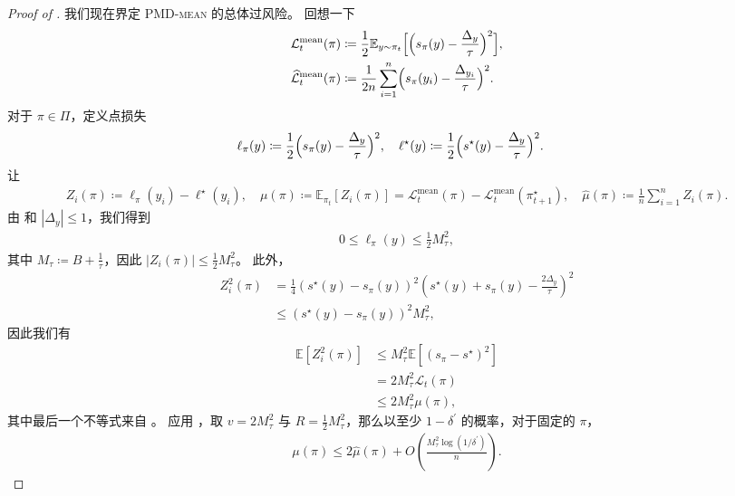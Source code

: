 \documentclass{article}
\theoremstyle{plain}
\theoremstyle{definition}
\theoremstyle{remark}
\newcommand{\E}{\mathbb{E}}
\newcommand{\abs}[1]{\left|#1\right|}
\begin{document}
\begin{proof}[Proof of ]
    我们现在界定 \textsc{PMD-mean} 的总体过风险。  
回想一下 
    \begin{align*}
        &\mathcal{L}^{\mathrm{mean}}_t(\pi)
        \coloneqq\frac{1}{2}\E_{y\sim\pi_t}\Bigl[\Bigl(s_\pi(y)-\frac{\Delta_y}{\tau}\Bigr)^2\Bigr],\\
        &\widehat{\mathcal{L}}^{\mathrm{mean}}_t(\pi) \coloneqq\frac{1}{2n}\sum_{i=1}^n\Bigl(s_\pi(y_i)-\frac{\Delta_{y_i}}{\tau}\Bigr)^2.
    \end{align*}
    对于 $\pi\in\Pi$，定义点损失
    \begin{align*}
        &\ell_\pi(y)\coloneqq \frac{1}{2}\Bigl(s_\pi(y)-\frac{\Delta_y}{\tau}\Bigr)^2,\quad 
        \ell^\star(y)\coloneqq \frac{1}{2}\Bigl(s^\star(y)-\frac{\Delta_y}{\tau}\Bigr)^2.
    \end{align*}
    让
    \begin{align*}
        Z_i(\pi)\coloneqq \ell_\pi(y_i)-\ell^\star(y_i),
        \quad
        \mu(\pi)\coloneqq \E_{\pi_t}[Z_i(\pi)]
        =
        \mathcal{L}^{\mathrm{mean}}_t(\pi)-\mathcal{L}^{\mathrm{mean}}_t(\pi^\star_{t+1}),
        \quad
        \widehat{\mu}(\pi)\coloneqq \frac{1}{n}\sum_{i=1}^n Z_i(\pi).
    \end{align*}
    由  和 $\abs{\Delta_y}\leq 1$，我们得到
    \begin{align*}
        0
        \leq \ell_\pi(y)
        \leq \frac{1}{2} M_\tau^2,
    \end{align*}
    其中 $M_\tau\coloneqq B+\frac{1}{\tau}$，因此 $\abs{Z_i(\pi)}\leq \frac{1}{2} M_\tau^2$。  
此外， 
    \begin{align*}
        Z_i^2(\pi)
        &=\frac{1}{4}(s^\star(y)-s_\pi(y))^2\left(s^\star(y)+s_\pi(y) - \frac{2\Delta_y}{\tau}\right)^2\\
        &\leq (s^\star(y)-s_\pi(y))^2 M_\tau^2,
    \end{align*}
    因此我们有
    \begin{align*}
        \E[Z_i^2(\pi)]
        &\leq M_\tau^2\E[(s_\pi-s^\star)^2]\\
        &=2M_\tau^2\mathcal{L}_t(\pi)\\
        &\leq 2M_\tau^2\mu(\pi),
    \end{align*}
    其中最后一个不等式来自 。  
应用 ，取 $v=2M_\tau^2$ 与 $R=\frac{1}{2} M_\tau^2$，那么以至少 $1-\delta^\prime$ 的概率，对于固定的 $\pi$， 
    \begin{align*}
        \mu(\pi)
        \leq 2\widehat{\mu}(\pi)+ O\left(\frac{M_\tau^2\log(1/\delta^\prime)}{n}\right).

\end{align*}
\end{proof}
\end{document}
